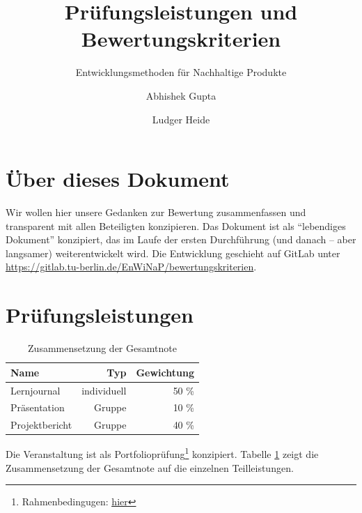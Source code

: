 \documentclass[DIV=15,headinclude]{scrartcl}
\begin{document}
\title{Prüfungsleistungen und Bewertungskriterien}
\subtitle{Entwicklungsmethoden für Nachhaltige Produkte}
\author{Abhishek Gupta \and Ludger Heide}
\maketitle

\tableofcontents


\listoftodos

\section{Über dieses Dokument}

Wir wollen hier unsere Gedanken zur Bewertung zusammenfassen und transparent mit allen Beteiligten konzipieren. Das Dokument ist als "`lebendiges Dokument"' konzipiert, das im Laufe der ersten Durchführung (und danach – aber langsamer) weiterentwickelt wird. Die Entwicklung geschieht auf GitLab unter \url{https://gitlab.tu-berlin.de/EnWiNaP/bewertungskriterien}.

\section{Prüfungsleistungen}

\begin{table}
	\centering
	\caption{Zusammensetzung der Gesamtnote}
	\label{tab:zusammensetzung}
	\begin{tabular}{lrr}
		\toprule
		Name & Typ & Gewichtung \\
		\midrule
		Lernjournal & individuell & 50 \% \\		
		Präsentation & Gruppe & 10 \% \\
		Projektbericht & Gruppe & 40 \% \\	
		\bottomrule
	\end{tabular}
\end{table}

Die Veranstaltung ist als Portfolioprüfung\footnote{Rahmenbedingugen: \href{https://www.tu-berlin.de/asv/menue/gremien/kommissionen_des_as/hinweise_zur_allgstupo/hinweise_zu_portfoliopruefungen/}{\underline{hier}}} konzipiert. Tabelle \ref{tab:zusammensetzung} zeigt die Zusammensetzung der Gesamtnote auf die einzelnen Teilleistungen.
\end{document}
